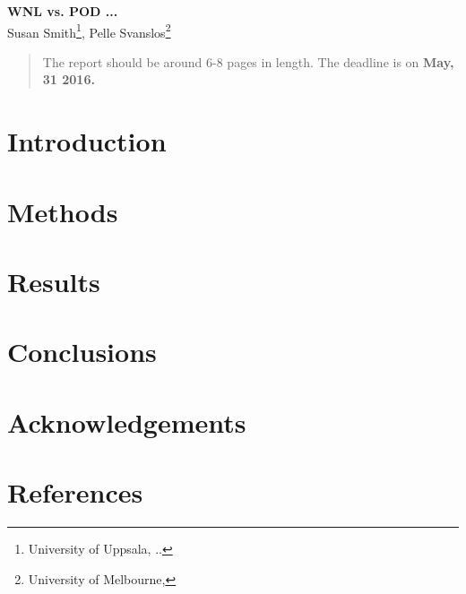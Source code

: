 \documentclass[11pt]{article}
\begin{document}
                                                    
\begin{center}
{\bf \Large WNL vs. POD ...}\\
\vspace{0.3cm}
{\large{Susan Smith\footnote{University of Uppsala, ..}, Pelle Svanslos\footnote{University of Melbourne,}}}
\end{center}
\vspace{0.3cm}


\begin{abstract}
The report should be around 6-8 pages in length. The deadline is on {\bf May, 31 2016.}
\end{abstract}
\section{Introduction}
\section{Methods}
\section{Results}
\section{Conclusions}
\section{Acknowledgements}
\section{References}
\end{document}
